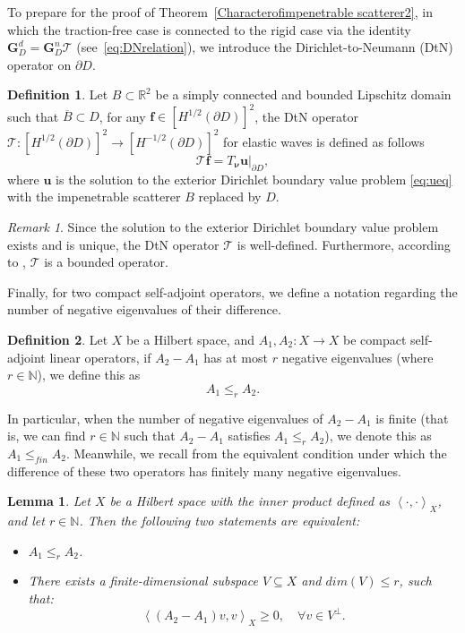 \documentclass[11pt,reqno,twoside]{amsart}
\newtheorem{lem}{Lemma}[section]
\theoremstyle{definition}
\newtheorem{defn}{Definition}[section]
\theoremstyle{remark}
\newtheorem{rem}{Remark}[section]
\numberwithin{equation}{section}
\begin{document}
To prepare for the proof of Theorem~\ref{Characterofimpenetrable scatterer2},  in which the traction-free case is connected to the rigid case via the identity $\mathbf{G}_D^d = \mathbf{G}_D^n \bm{\mathcal{T}}$ (see~\eqref{eq:DNrelation}), we introduce the Dirichlet-to-Neumann (DtN) operator on $\partial D$.
\begin{defn} \label{de:DtN} 
		Let $B \subset \mathbb{R}^2$ be a simply connected and bounded Lipschitz domain such that $\overline{B} \subset D$, for any $\mathbf f\in \left[H^{1/2}\left(\partial D \right) \right]^2$, the DtN operator $ \bm{\mathcal{T}}: \left[H^{1/2}\left(\partial D \right) \right]^2 \to \left[H^{-1/2}\left(\partial D \right) \right]^2 $ for elastic waves is defined as follows
		$$ \bm{\mathcal{T}} \mathbf f =T_{\bm\nu}\mathbf u\vert_{\partial D},$$
		where $\mathbf u$ is the solution to the exterior Dirichlet boundary value problem \eqref{eq:ueq} with the impenetrable scatterer $B$ replaced by $D$.
\end{defn}
\begin{rem}
Since the solution to the exterior Dirichlet boundary value problem exists and is unique, the DtN operator $\bm{\mathcal{T}}$ is well-defined. Furthermore, according to \cite{BHSY18}, $\bm{\mathcal{T}}$ is a bounded operator.
\end{rem}

Finally, for two compact self-adjoint operators, we define a notation regarding the number of negative eigenvalues of their difference.
\begin{defn} %
	Let $X$ be a Hilbert space, and $A_1,A_2: X \to X $ be compact self-adjoint linear operators, if $A_2-A_1$ has at most $r$ negative eigenvalues (where $r\in \mathbb N$), we define this as
	$$
	A_1 \leq_r A_2.
	$$
\end{defn}

In particular, when the number of negative eigenvalues of $A_2-A_1$ is finite (that is, we can find $r \in \mathbb N$ such that $A_2-A_1$ satisfies $A_1 \leq_r A_2$), we denote this as $A_1 \leq_{fin} A_2$. Meanwhile, we recall from \cite{HPS19b} the equivalent condition under which the difference of these two operators has finitely many negative eigenvalues.

\begin{lem}\label{EquDef}
	Let $X$ be a Hilbert space with the inner product defined as $\left\langle  \cdot , \cdot \right\rangle _X$, and let $r \in \mathbb N$. Then the following two statements are equivalent:
	\begin{itemize}
		\item [(1).] $ A_1 \leq_r A_2 $.
		\item [(2).] There exists a finite-dimensional subspace $V \subseteq X$ and $dim \left( V\right) \leq r$, such that:
		$$
		\left\langle  \left( A_2- A_1\right) v, v \right\rangle _X \geq 0, \quad \forall v \in V^{\perp}.
		$$
	\end{itemize}
\end{lem}
\end{document}
